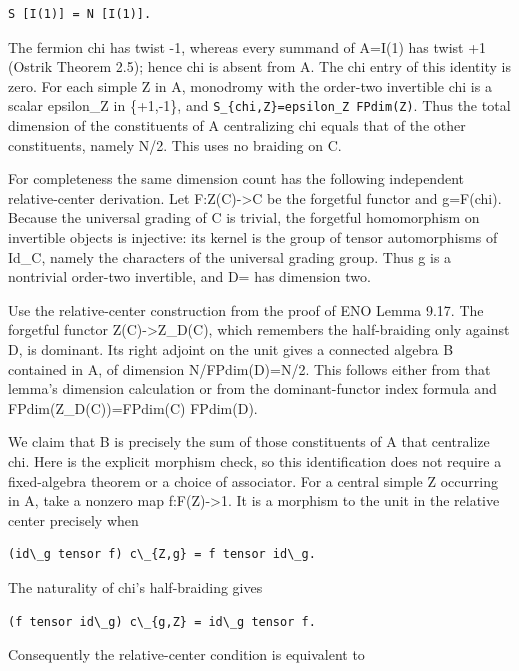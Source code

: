 \begin{verbatim}
S [I(1)] = N [I(1)].
\end{verbatim}

The fermion chi has twist -1, whereas every summand of A=I(1) has twist
+1 (Ostrik Theorem 2.5); hence chi is absent from A. The chi entry of
this identity is zero. For each simple Z in A, monodromy with the
order-two invertible chi is a scalar epsilon\_Z in \{+1,-1\}, and
\texttt{S\_\allowbreak{}\{chi,Z\allowbreak{}\}=epsi\allowbreak{}lon\_\allowbreak{}Z FPdi\allowbreak{}m(Z)}.
Thus the total dimension of the constituents of A centralizing chi
equals that of the other constituents, namely N/2. This uses no braiding
on C.

For completeness the same dimension count has the following independent
relative-center derivation. Let F:Z(C)-\textgreater C be the forgetful
functor and g=F(chi). Because the universal grading of C is trivial, the
forgetful homomorphism on invertible objects is injective: its kernel is
the group of tensor automorphisms of Id\_C, namely the characters of the
universal grading group. Thus g is a nontrivial order-two invertible,
and D= has dimension two.

Use the relative-center construction from the proof of ENO Lemma 9.17.
The forgetful functor Z(C)-\textgreater Z\_D(C), which remembers the
half-braiding only against D, is dominant. Its right adjoint on the unit
gives a connected algebra B contained in A, of dimension N/FPdim(D)=N/2.
This follows either from that lemma's dimension calculation or from the
dominant-functor index formula and FPdim(Z\_D(C))=FPdim(C) FPdim(D).

We claim that B is precisely the sum of those constituents of A that
centralize chi. Here is the explicit morphism check, so this
identification does not require a fixed-algebra theorem or a choice of
associator. For a central simple Z occurring in A, take a nonzero map
f:F(Z)-\textgreater1. It is a morphism to the unit in the relative
center precisely when

\begin{verbatim}
(id\_g tensor f) c\_{Z,g} = f tensor id\_g.
\end{verbatim}

The naturality of chi's half-braiding gives

\begin{verbatim}
(f tensor id\_g) c\_{g,Z} = id\_g tensor f.
\end{verbatim}

Consequently the relative-center condition is equivalent to

